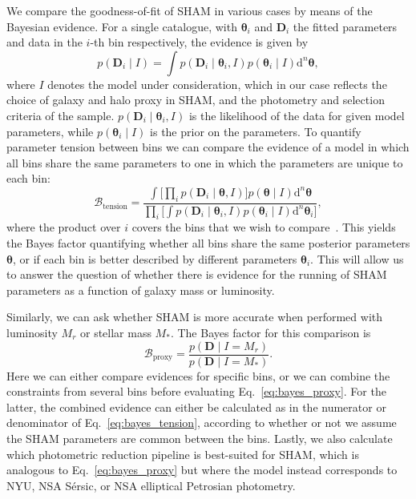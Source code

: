 \documentclass[usenatbib,useAMS]{mnras}
\newcommand{\D}{\ensuremath{\mathrm{\bm{D}}}}
\begin{document}
We compare the goodness-of-fit of \ac{SHAM} in various cases by means of the Bayesian evidence. For a single catalogue, with  $\bm{\theta}_i$ and $\D_i$ the fitted parameters and data in the $i$-th bin respectively, the evidence is given by
% 
\begin{equation}
    p\left(\D_i \mid I\right)
    =
    \int p\left(\D_i \mid \bm{\theta}_i, I\right)
    p\left(\bm{\theta}_i \mid I \right) \mathrm{d}^{n}\bm{\theta},
\end{equation}
% 
where $I$ denotes the model under consideration, which in our case reflects the choice of galaxy and halo proxy in \ac{SHAM}, and the photometry and selection criteria of the sample. $p\left(\D_i \mid \bm{\theta}_i, I\right)$ is the likelihood of the data for given model parameters, while $p\left(\bm{\theta}_i \mid I \right)$ is the prior on the parameters. To quantify parameter tension between bins we can compare the evidence of a model in which all bins share the same parameters to one in which the parameters are unique to each bin:
%
\begin{equation}\label{eq:bayes_tension}
    \mathcal{B}_\mathrm{tension}
    = 
    \frac
    {\int \Big[ \prod_i p\left(\D_i \mid \bm{\theta}, I\right)\Big]
    p\left(\bm{\theta} \mid I \right) \mathrm{d}^{n}\bm{\theta}
    }
    {\prod_i \Big[ \int p\left(\D_i \mid \bm{\theta}_i, I\right)
    p\left(\bm{\theta}_i \mid I \right) \mathrm{d}^{n}\bm{\theta}_i \Big]
    },
\end{equation}
% 
where the product over $i$ covers the bins that we wish to compare~\citep{Evidence_test}. This yields the Bayes factor quantifying whether all bins share the same posterior parameters $\bm{\theta}$, or if each bin is better described by different parameters $\bm{\theta}_i$. This will allow us to answer the question of whether there is evidence for the running of \ac{SHAM} parameters as a function of galaxy mass or luminosity.

Similarly, we can ask whether \ac{SHAM} is more accurate when performed with luminosity $M_r$ or stellar mass $M_*$. The Bayes factor for this comparison is
% 
\begin{equation}\label{eq:bayes_proxy}
    \mathcal{B}_{\mathrm{proxy}}
    =
    \frac
    {p\left(\D \mid I=M_r\right)}
    {p\left(\D \mid I=M_*\right)}.
\end{equation}
% 
Here we can either compare evidences for specific bins, or we can combine the constraints from several bins before evaluating Eq.~\ref{eq:bayes_proxy}. For the latter, the combined evidence can either be calculated as in the numerator or denominator of Eq.~\eqref{eq:bayes_tension}, according to whether or not we assume the \ac{SHAM} parameters are common between the bins. Lastly, we also calculate which photometric reduction pipeline is best-suited for \ac{SHAM}, which is analogous to Eq.~\eqref{eq:bayes_proxy} but where the model instead corresponds to \ac{NYU}, \ac{NSA} S\'ersic, or \ac{NSA} elliptical Petrosian photometry.
\end{document}
